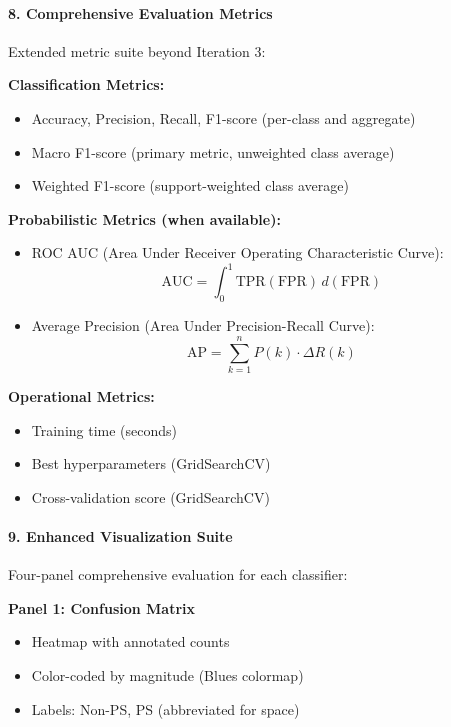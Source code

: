 \documentclass[11pt, titlepage, bibliography=totoc]{scrreprt}
\begin{document}
\paragraph{8. Comprehensive Evaluation Metrics}
Extended metric suite beyond Iteration 3:

\textbf{Classification Metrics:}
\begin{itemize}
    \item Accuracy, Precision, Recall, F1-score (per-class and aggregate)
    \item Macro F1-score (primary metric, unweighted class average)
    \item Weighted F1-score (support-weighted class average)
\end{itemize}

\textbf{Probabilistic Metrics (when available):}
\begin{itemize}
    \item ROC AUC (Area Under Receiver Operating Characteristic Curve):
    \begin{equation}
    \text{AUC} = \int_{0}^{1} \text{TPR}(\text{FPR}) \, d(\text{FPR})
    \end{equation}
    \item Average Precision (Area Under Precision-Recall Curve):
    \begin{equation}
    \text{AP} = \sum_{k=1}^{n} P(k) \cdot \Delta R(k)
    \end{equation}
\end{itemize}

\textbf{Operational Metrics:}
\begin{itemize}
    \item Training time (seconds)
    \item Best hyperparameters (GridSearchCV)
    \item Cross-validation score (GridSearchCV)
\end{itemize}

\paragraph{9. Enhanced Visualization Suite}
Four-panel comprehensive evaluation for each classifier:

\textbf{Panel 1: Confusion Matrix}
\begin{itemize}
    \item Heatmap with annotated counts
    \item Color-coded by magnitude (Blues colormap)
    \item Labels: Non-PS, PS (abbreviated for space)
\end{itemize}
\end{document}
